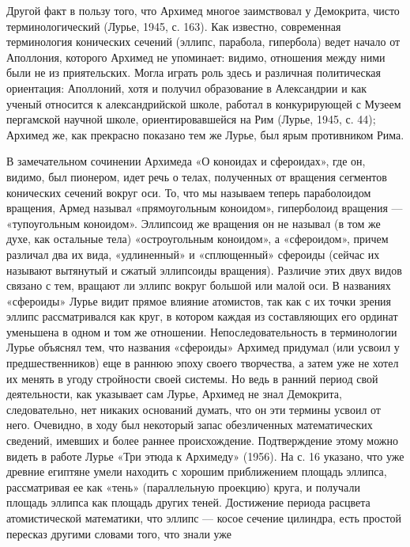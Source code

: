 Другой факт в пользу того, что Архимед многое заимствовал у Демокрита,
чисто  терминологический   (Лурье,  1945,   с.  163).   Как  известно,
современная   терминология  конических   сечений  (эллипс,   парабола,
гипербола) ведет  начало от Аполлония, которого  Архимед не упоминает:
видимо, отношения  между ними  были не  из приятельских.  Могла играть
роль  здесь  и  различная  политическая  ориентация:  Аполлоний,  хотя
и  получил  образование  в  Александрии   и  как  ученый  относится  к
александрийской  школе, работал  в конкурирующей  с Музеем  пергамской
научной школе, ориентировавшейся на Рим  (Лурье, 1945, с. 44); Архимед
же, как прекрасно показано тем же Лурье, был ярым противником Рима.

В  замечательном  сочинении Архимеда  «О  коноидах  и сфероидах»,  где
он,  видимо,   был  пионером,  идет   речь  о  телах,   полученных  от
вращения  сегментов   конических  сечений  вокруг  оси.   То,  что  мы
называем  теперь параболоидом  вращения, Армед  называл «прямоугольным
коноидом», гиперболоид вращения --- «тупоугольным коноидом». Эллипсоид
же  вращения  он не  называл  (в  том  же  духе, как  остальные  тела)
«остроугольным коноидом», а «сфероидом»,  причем различал два их вида,
«удлиненный» и  «сплющенный» сфероиды (сейчас их  называют вытянутый и
сжатый эллипсоиды вращения).  Различие этих двух видов  связано с тем,
вращают ли эллипс вокруг большой или малой оси. В названиях «сфероиды»
Лурье  видит прямое  влияние  атомистов,  так как  с  их точки  зрения
эллипс рассматривался как  круг, в котором каждая  из составляющих его
ординат уменьшена в  одном и том же  отношении. Непоследовательность в
терминологии  Лурье  объяснял  тем, что  названия  «сфероиды»  Архимед
придумал (или  усвоил у  предшественников) еще  в раннюю  эпоху своего
творчества, а  затем уже не хотел  их менять в угоду  стройности своей
системы.  Но ведь  в ранний  период свой  деятельности, как  указывает
сам  Лурье,  Архимед не  знал  Демокрита,  следовательно, нет  никаких
оснований думать, что он эти термины  усвоил от него. Очевидно, в ходу
был  некоторый  запас  обезличенных математических  сведений,  имевших
и  более  раннее происхождение.  Подтверждение  этому  можно видеть  в
работе Лурье  «Три этюда  к Архимеду»  (1956). На  с. 16  указано, что
уже  древние египтяне  умели находить  с хорошим  приближением площадь
эллипса, рассматривая  ее как «тень» (параллельную  проекцию) круга, и
получали площадь эллипса как  площадь других теней. Достижение периода
расцвета  атомистической  математики,  что эллипс  ---  косое  сечение
цилиндра, есть  простой пересказ другими  словами того, что  знали уже
